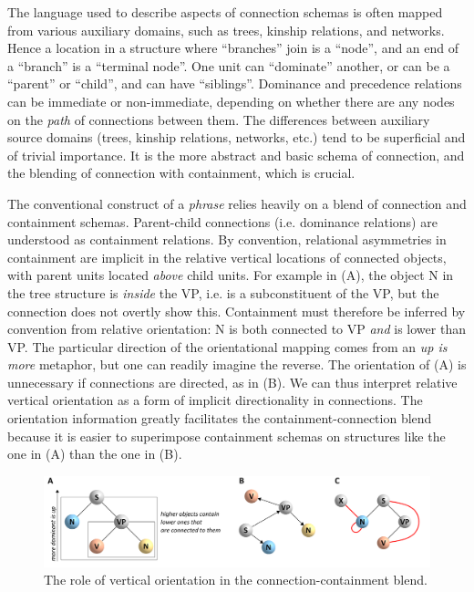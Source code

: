   The language used to describe aspects of connection schemas is often mapped from various auxiliary domains, such as trees, kinship relations, and networks. Hence a location in a structure where “branches” join is a “node”, and an end of a “branch” is a “terminal node”. One unit can “dominate” another, or can be a “parent” or “child”, and can have “siblings”. Dominance and precedence relations can be immediate or non-immediate, depending on whether there are any nodes on the \textit{path} of connections between them. The differences between auxiliary source domains (trees, kinship relations, networks, etc.) tend to be superficial and of trivial importance. It is the more abstract and basic schema of connection, and the blending of connection with containment, which is crucial.   

  The conventional construct of a \textit{phrase} relies heavily on a blend of connection and containment schemas. Parent-child connections (i.e. dominance relations) are understood as containment relations. By convention, relational asymmetries in containment are implicit in the relative vertical locations of connected objects, with parent units located \textit{above} child units. For example in {}(A), the object N in the tree structure is \textit{inside} the VP, i.e. is a subconstituent of the VP, but the connection does not overtly show this. Containment must therefore be inferred by convention from relative orientation: N is both connected to VP \textit{and} is lower than VP. The particular direction of the orientational mapping comes from an \textit{up is more} metaphor, but one can readily imagine the reverse. The orientation of (A) is unnecessary if connections are directed, as in (B). We can thus interpret relative vertical orientation as a form of implicit directionality in connections. The orientation information greatly facilitates the containment-connection blend because it is easier to superimpose containment schemas on structures like the one in (A) than the one in (B). 

  
\begin{figure}
\includegraphics[width=\textwidth]{figures/Tilsen-img35.png}
\caption{The role of vertical orientation in the connection-containment blend.}
\label{fig:3:7}
\end{figure}
 

